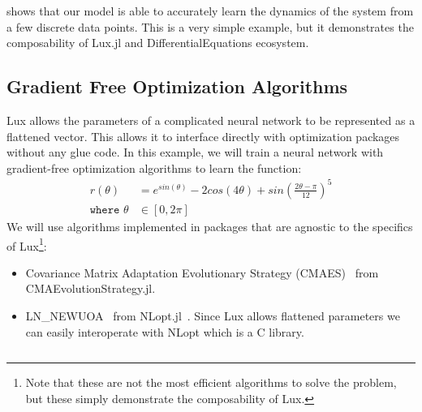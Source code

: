 
 shows that our model is able to accurately learn the dynamics of the system from a few discrete data points. This is a very simple example, but it demonstrates the composability of Lux.jl and DifferentialEquations ecosystem.

\subsection{Gradient Free Optimization Algorithms}
\label{subsec:evolutionary_alg_lux}

Lux allows the parameters of a complicated neural network to be represented as a flattened vector. This allows it to interface directly with optimization packages without any glue code. In this example, we will train a neural network with gradient-free optimization algorithms to learn the function:
%
\begin{align}
  r(\theta)              & = e^{sin(\theta)} - 2cos(4\theta) + sin\left(\frac{2\theta - \pi}{12}\right)^5 \\
  \texttt{where } \theta & \in [0, 2\pi]
\end{align}
%
We will use algorithms implemented in packages that are agnostic to the specifics of Lux\footnote{Note that these are not the most efficient algorithms to solve the problem, but these simply demonstrate the composability of Lux.}:
%
\begin{itemize}
  \item Covariance Matrix Adaptation Evolutionary Strategy (CMAES)~\citep{hansen2016cma} from CMAEvolutionStrategy.jl.
  \item LN\_NEWUOA~\citep{powell2006newuoa} from NLopt.jl~\citep{johnson2021nlopt}. Since Lux allows flattened parameters we can easily interoperate with NLopt which is a C library.
\end{itemize}
%

\inputminted[linenos, breaklines, fontsize=\scriptsize, frame=single, framesep=10pt]{julia}{../code/gfopt.jl}


